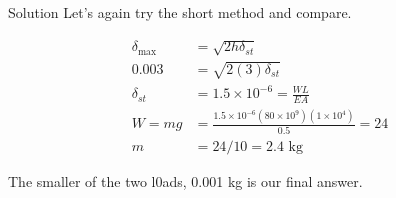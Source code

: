 \documentclass[10pt, svgnames]{beamer}
\begin{document}
\begin{frame}[label={sec:org6338f4d}]{Solution}
Let's again try the short method and compare.

\begin{align*}
    \delta_{\max} &= \sqrt{2h\delta_{st}} \\
    0.003 &= \sqrt{2(3)\delta_{st}} \\
    \delta_{st} &= 1.5 \times 10^{-6} = \frac{WL}{EA} \\
    W = mg &= \frac{1.5 \times 10^{-6}(80 \times 10^{9})(1 \times 10^{4})}{0.5} = 24 \\
    m &= 24/10 = 2.4 \text{ kg}
\end{align*}

The smaller of the two l0ads, 0.001 kg is our final answer.
\end{frame}
\end{document}
